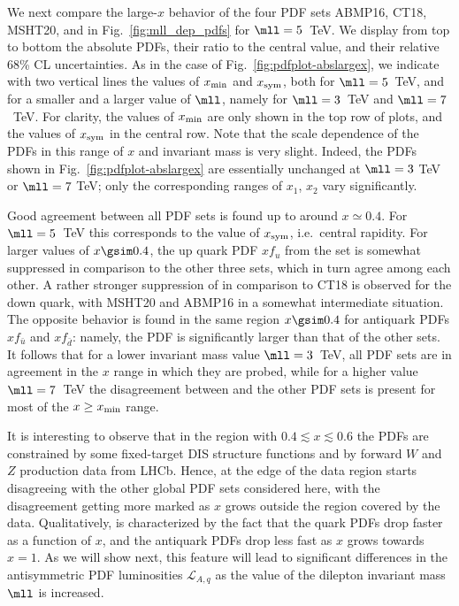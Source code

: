 We next compare the large-$x$ behavior 
of the four PDF sets ABMP16, CT18, MSHT20, and  in Fig.~\ref{fig:mll_dep_pdfs}
for $\mll=5$~TeV.
%
We display from top to bottom the absolute PDFs, their ratio to the central  value, and
their relative 68\% CL uncertainties.
%
As in the case of Fig.~\ref{fig:pdfplot-abslargex}, we indicate with two vertical lines
the values of $x_{\rm min}$ and $x_{\rm  sym}$,
both for $\mll=5$~TeV, and for a smaller and a larger value of $\mll$,
namely for $\mll=3$~TeV and  $\mll=7$~TeV.
%
For clarity, the values of $x_{\rm min}$ are only shown 
in the top row of plots, and the values of  $x_{\rm  sym}$ in the
central row. Note that the scale dependence
of the PDFs in this range of  $x$ and invariant mass is very
slight. Indeed, the PDFs shown in Fig.~\ref{fig:pdfplot-abslargex} are
essentially unchanged at $\mll=3$ TeV or  $\mll=7$ TeV;  only the
corresponding ranges of $x_1$, $x_2$ vary significantly.

Good agreement between all PDF
sets is found up to around $x\simeq 0.4$.
%
For $\mll=5$~TeV this corresponds to the value of $x_{\rm sym}$, i.e.\ central rapidity.
%
For larger values of $x\gsim 0.4$, the up  quark PDF $xf_u$ from the
 set is somewhat
suppressed in comparison to the other three sets, which in turn agree
among each other.
%
A rather stronger suppression of
  in comparison to  CT18 is observed for the down quark, with
MSHT20 and ABMP16 in a somewhat intermediate situation.
%
The opposite behavior is found in the same region $x\gsim 0.4$ for
antiquark PDFs  $xf_{\bar{u}}$ and $xf_{\bar{d}}$:
namely, the  PDF is significantly  larger than that of the other sets.
It follows that for a lower invariant mass value  $\mll = 3$~TeV, all
PDF sets are  in agreement in the $x$ range in which they are probed,
while for a higher value  $\mll = 7$~TeV the 
disagreement between  and the other PDF sets is present for
most of the $x\ge x_{\rm min}$ range.

It is interesting to observe that in the region with $0.4\lesssim x\lesssim 0.6$ the
PDFs are constrained by some fixed-target DIS structure functions and by
 forward $W$ and $Z$ production data from LHCb. Hence, at
the edge of the data region  starts disagreeing with the other
global PDF sets considered here, with the disagreement getting more
marked as $x$ grows outside the region covered by the
data.
%
Qualitatively,  is characterized by the fact that the
quark PDFs drop faster as a function of $x$, and the antiquark PDFs
drop less fast as $x$ grows towards $x=1$.
As we will show next, this feature will lead to significant differences
in the antisymmetric PDF luminosities $\mathcal{L}_{A,q}$ as the value of
the dilepton invariant mass $\mll$ is increased.

